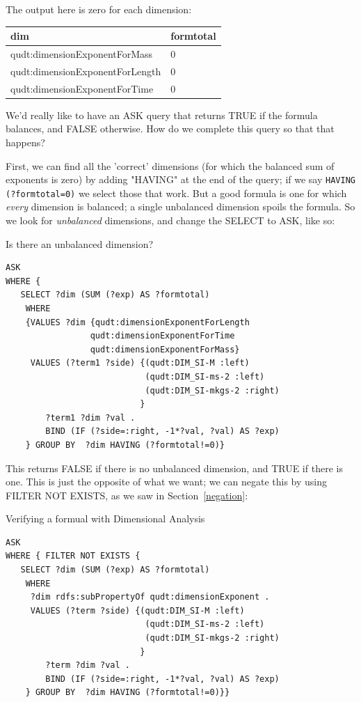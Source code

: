 The output here is zero for each dimension:

\begin{tabular}{|ll|}
\hline
dim&formtotal\\
\hline
qudt:dimensionExponentForMass&0\\
qudt:dimensionExponentForLength&0\\
qudt:dimensionExponentForTime&0\\
\hline
\end{tabular}

We'd really like to have an ASK query that returns TRUE if the 
formula balances, and FALSE otherwise.  How do we complete this query so that 
that happens? 

First, we can find all the 'correct' dimensions (for which the balanced sum of 
exponents is zero) by adding "HAVING" at the end of the query; if we say \texttt{HAVING (?formtotal=0)} we
select those that work.  But a good formula is one for which \emph{every} dimension
is balanced; a single unbalanced dimension spoils the formula.  So we look for \emph{unbalanced} 
dimensions, and change the SELECT to ASK, like so:

\begin{query}Is there an unbalanced dimension?\end{query}
\begin{lstlisting}
ASK
WHERE { 
   SELECT ?dim (SUM (?exp) AS ?formtotal)
    WHERE 
    {VALUES ?dim {qudt:dimensionExponentForLength 
                 qudt:dimensionExponentForTime 
                 qudt:dimensionExponentForMass}
     VALUES (?term1 ?side) {(qudt:DIM_SI-M :left)
                            (qudt:DIM_SI-ms-2 :left)
                            (qudt:DIM_SI-mkgs-2 :right)
                           }
        ?term1 ?dim ?val .
        BIND (IF (?side=:right, -1*?val, ?val) AS ?exp)
    } GROUP BY  ?dim HAVING (?formtotal!=0)}
\end{lstlisting}

This returns FALSE if there is no unbalanced dimension, and TRUE if there is one. 
This is just the opposite of what we want; we can negate this by using
FILTER NOT EXISTS, as we saw in Section~\ref{negation}:



\begin{query}Verifying a formual with Dimensional Analysis\end{query}
\begin{lstlisting}
ASK  
WHERE { FILTER NOT EXISTS {
   SELECT ?dim (SUM (?exp) AS ?formtotal)
    WHERE 
     ?dim rdfs:subPropertyOf qudt:dimensionExponent .
     VALUES (?term ?side) {(qudt:DIM_SI-M :left)
                            (qudt:DIM_SI-ms-2 :left)
                            (qudt:DIM_SI-mkgs-2 :right)
                           }
        ?term ?dim ?val .
        BIND (IF (?side=:right, -1*?val, ?val) AS ?exp)
    } GROUP BY  ?dim HAVING (?formtotal!=0)}}
\end{lstlisting}

